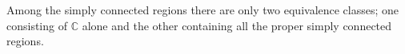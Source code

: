 Among the simply connected regions there are only two equivalence classes; one consisting of $\mathbb{C}$ alone and the other containing all the proper simply connected regions.
